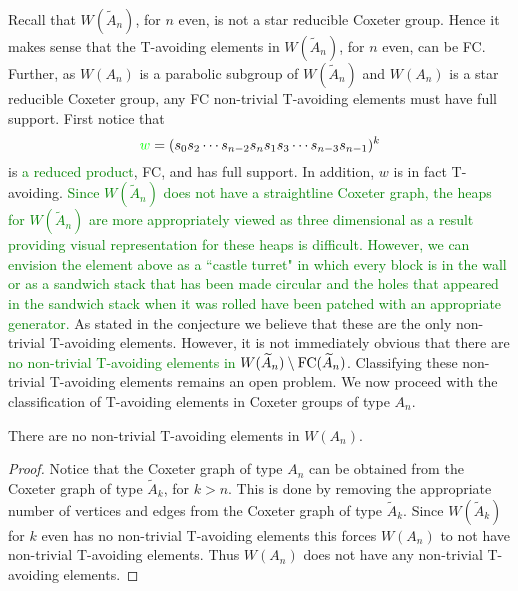 Recall that $W(\widetilde{A}_n)$, for $n$ even, is not a star reducible Coxeter group. Hence it makes sense that the T-avoiding elements in $W(\widetilde{A}_n)$, for $n$ even, can be FC. Further, as $W(A_n)$ is a parabolic subgroup of $W(\widetilde{A}_n)$ and $W(A_n)$ is a star reducible Coxeter group, any FC non-trivial T-avoiding elements must have full support. First notice that \[\textcolor{green}{w}=(s_0s_2 \cdots s_{n-2}s_ns_1s_3 \cdots s_{n-3}s_{n-1})^k\] is \textcolor{green}{a reduced product}, FC, and has full support. In addition, $w$ is in fact T-avoiding. \textcolor{green}{Since $W(\widetilde{A}_n)$ does not have a straightline Coxeter graph, the heaps for $W(\widetilde{A}_n)$ are more appropriately viewed as three dimensional as a result providing visual representation for these heaps is difficult. However, we can envision the element above as a ``castle turret" in which every block is in the wall or as a sandwich stack that has been made circular and the holes that appeared in the sandwich stack when it was rolled have been patched with an appropriate generator.} As stated in the conjecture we believe that these are the only non-trivial T-avoiding elements. However, it is not immediately obvious that there are \textcolor{green}{no non-trivial T-avoiding elements in $W(\widetilde{A}_n)\setminus \mathrm{FC}(\widetilde{A}_n)$}. Classifying these non-trivial T-avoiding elements remains an open problem. We now proceed with the classification of T-avoiding elements in Coxeter groups of type $A_n$. 

\begin{corollary}
There are no non-trivial T-avoiding elements in $W(A_n)$. 
\begin{proof}
Notice that the Coxeter graph of type $A_n$ can be obtained from the Coxeter graph of type $\widetilde{A}_k$, for $k > n$. This is done by removing the appropriate number of vertices and edges from the Coxeter graph of type $\widetilde{A}_k$. Since $W(\widetilde{A}_k)$ for $k$ even has no non-trivial T-avoiding elements this forces $W(A_n)$ to not have non-trivial T-avoiding elements. Thus $W(A_n)$ does not have any non-trivial T-avoiding elements.  
\end{proof}
\end{corollary}


